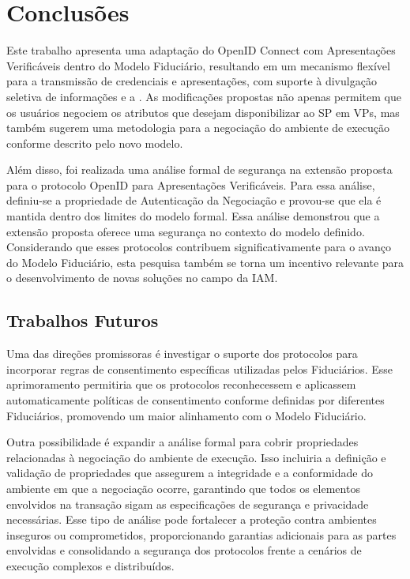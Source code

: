 \newpage
\section{Conclusões} \label{section:conclusion}

Este trabalho apresenta uma adaptação do OpenID Connect com Apresentações Verificáveis dentro do Modelo Fiduciário, resultando em um mecanismo flexível para a transmissão de credenciais e apresentações, com suporte à divulgação seletiva de informações e a . As modificações propostas não apenas permitem que os usuários negociem os atributos que desejam disponibilizar ao \acs{SP} em \acs{VP}s, mas também sugerem uma metodologia para a negociação do ambiente de execução conforme descrito pelo novo modelo. 

Além disso, foi realizada uma análise formal de segurança na extensão proposta para o protocolo OpenID para Apresentações Verificáveis. Para essa análise, definiu-se a propriedade de Autenticação da Negociação e provou-se que ela é mantida dentro dos limites do modelo formal. Essa análise demonstrou que a extensão proposta oferece uma segurança no contexto do modelo definido. Considerando que esses protocolos contribuem significativamente para o avanço do Modelo Fiduciário, esta pesquisa também se torna um incentivo relevante para o desenvolvimento de novas soluções no campo da \acs{IAM}.

\subsection{Trabalhos Futuros}

Uma das direções promissoras é investigar o suporte dos protocolos para incorporar regras de consentimento específicas utilizadas pelos Fiduciários. Esse aprimoramento permitiria que os protocolos reconhecessem e aplicassem automaticamente políticas de consentimento conforme definidas por diferentes Fiduciários, promovendo um maior alinhamento com o Modelo Fiduciário.

Outra possibilidade é expandir a análise formal para cobrir propriedades relacionadas à negociação do ambiente de execução. Isso incluiria a definição e validação de propriedades que assegurem a integridade e a conformidade do ambiente em que a negociação ocorre, garantindo que todos os elementos envolvidos na transação sigam as especificações de segurança e privacidade necessárias. Esse tipo de análise pode fortalecer a proteção contra ambientes inseguros ou comprometidos, proporcionando garantias adicionais para as partes envolvidas e consolidando a segurança dos protocolos frente a cenários de execução complexos e distribuídos.